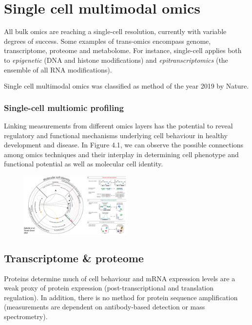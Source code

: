 \graphicspath{{chapters/04/}}
\chapter{Single cell multimodal omics}

All bulk omics are reaching a single-cell resolution, currently with
variable degrees of success. Some examples of trans-omics encompass
genome, transcriptome, proteome and metabolome. For instance,
single-cell applies both to \emph{epigenetic} (DNA and histone
modifications) and \emph{epitranscriptomics} (the ensemble of all RNA
modifications).

Single cell multimodal omics was classified as method of the year 2019
by Nature.

\hypertarget{single-cell-multiomic-profiling}{%
\subsection{Single-cell multiomic
profiling}\label{single-cell-multiomic-profiling}}

Linking measurements from different omics layers has the potential to
reveal regulatory and functional mechanisms underlying cell behaviour in
healthy development and disease. In Figure 4.1, we can observe the
possible connections among omics techniques and their interplay in
determining cell phenotype and functional potential as well as molecular
cell identity.

\begin{figure}
\centering
\includegraphics[width=0.5\textwidth]{images/Screenshot.png}
\caption{}
\end{figure}

\hypertarget{transcriptome-proteome}{%
\section{Transcriptome \& proteome}\label{transcriptome-proteome}}

Proteins determine much of cell behaviour and mRNA expression levels are
a weak proxy of protein expression (post-transcriptional and translation
regulation). In addition, there is no method for protein sequence
amplification (measurements are dependent on antibody-based detection or
mass spectrometry).

